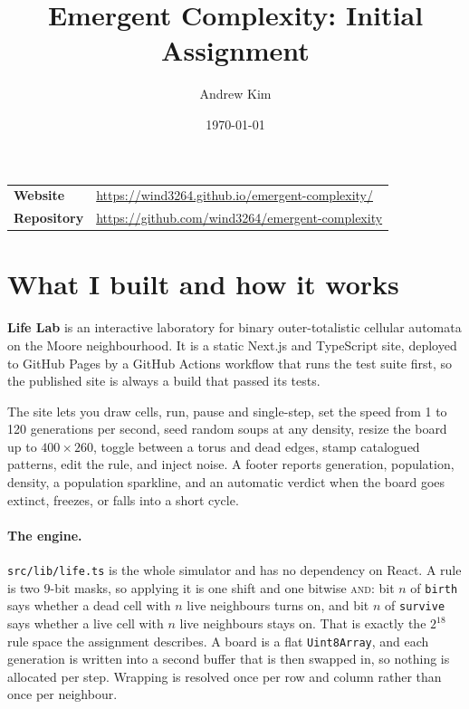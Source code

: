 \documentclass[11pt]{article}
\title{\vspace{-2.5em}Emergent Complexity: Initial Assignment}
\author{Andrew Kim}
\date{\today}
\begin{document}
\maketitle
\vspace{-1.5em}

\begin{center}
\small
\begin{tabular}{ll}
\textbf{Website} & \url{https://wind3264.github.io/emergent-complexity/} \\
\textbf{Repository} & \url{https://github.com/wind3264/emergent-complexity} \\
\end{tabular}
\end{center}

\vspace{0.5em}

\section{What I built and how it works}

\textbf{Life Lab} is an interactive laboratory for binary outer-totalistic cellular automata on the
Moore neighbourhood. It is a static Next.js and TypeScript site, deployed to GitHub Pages by a
GitHub Actions workflow that runs the test suite first, so the published site is always a build that
passed its tests.

The site lets you draw cells, run, pause and single-step, set the speed from 1 to 120 generations
per second, seed random soups at any density, resize the board up to $400\times260$, toggle between a
torus and dead edges, stamp catalogued patterns, edit the rule, and inject noise. A footer reports
generation, population, density, a population sparkline, and an automatic verdict when the board
goes extinct, freezes, or falls into a short cycle.

\paragraph{The engine.} \texttt{src/lib/life.ts} is the whole simulator and has no dependency on
React. A rule is two 9-bit masks, so applying it is one shift and one bitwise \textsc{and}: bit $n$
of \texttt{birth} says whether a dead cell with $n$ live neighbours turns on, and bit $n$ of
\texttt{survive} says whether a live cell with $n$ live neighbours stays on. That is exactly the
$2^{18}$ rule space the assignment describes. A board is a flat \texttt{Uint8Array}, and each
generation is written into a second buffer that is then swapped in, so nothing is allocated per
step. Wrapping is resolved once per row and column rather than once per neighbour.
\end{document}
